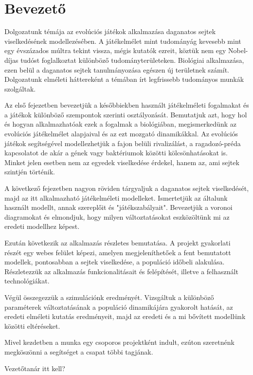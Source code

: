 \section{Bevezető}

Dolgozatunk témája az evolúciós játékok alkalmazása daganatos sejtek viselkedésének modellezésében. A játékelmélet mint tudományág kevesebb mint egy évszázados múltra tekint vissza, mégis kutatók ezreit, köztük nem egy Nobel-díjas tudóst foglalkoztat különböző tudományterületeken. Biológiai alkalmazása, ezen belül a daganatos sejtek tanulmányozása egészen új területnek számít. Dolgozatunk elméleti háttereként a témában írt legfrissebb tudományos munkák szolgáltak.

Az első fejezetben bevezetjük a későbbiekben használt játékelméleti fogalmakat és a játékok különböző szempontok szerinti osztályozását. Bemutatjuk azt, hogy hol és hogyan alkalmazhatóak ezek a fogalmak a biológiában, megismerkedünk az evolúciós játékelmélet alapjaival és az ezt mozgató dinamikákkal. Az evolúciós játékok segítségével modellezhetjük a fajon belüli rivalizálást, a ragadozó-préda kapcsolatot de akár a gének vagy baktériumok közötti kölcsönhatásokat is. Minket jelen esetben nem az egyedek viselkedése érdekel, hanem az, ami sejtek szintjén történik.

A következő fejezetben nagyon röviden tárgyaljuk a daganatos sejtek viselkedését, majd az itt alkalmazható játékelméleti modelleket. Ismertetjük az általunk használt modellt, annak szereplőit és "játékszabályait". Bevezetjük a voronoi diagramokat és elmondjuk, hogy milyen változtatásokat eszközöltünk mi az eredeti modellhez képest. 

Ezután következik az alkalmazás részletes bemutatása. A projekt gyakorlati részét egy webes felület képezi, amelyen megjeleníthetőek a fent bemutatott modellek, pontosabban a sejtek viselkedése, a populáció időbeli alakulása. Részletezzük az alkalmazás funkcionalitásait és felépítését, illetve a felhasznált technológiákat.

Végül összegezzük a szimulációnk eredményét. Vizsgáltuk a különböző paraméterek változtatásának a populáció dinamikájára gyakorolt hatását, az eredeti elméleti kutatás eredményeit, majd az eredeti és a mi bővített modellünk közötti eltéréseket.

Mivel kezdetben a munka egy csoporos projektként indult, ezúton szeretnénk megköszönni a segítséget a csapat többi tagjának. 

Vezetőtanár itt kell? 